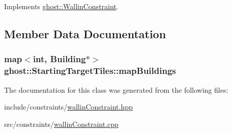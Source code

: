 Implements \hyperlink{classghost_1_1WallinConstraint_aef93d84e063f20ffeb3ff584fe6fabad}{ghost\-::\-Wallin\-Constraint}.



\subsection{Member Data Documentation}
\hypertarget{classghost_1_1StartingTargetTiles_a08e51275da85bfaa8a108976cbd133e2}{
\subsubsection[{map\-Buildings}]{\setlength{\rightskip}{0pt plus 5cm}map$<$int, {\bf Building}$\ast$$>$ ghost\-::\-Starting\-Target\-Tiles\-::map\-Buildings\hspace{0.3cm}{\ttfamily [private]}}}\label{classghost_1_1StartingTargetTiles_a08e51275da85bfaa8a108976cbd133e2}


The documentation for this class was generated from the following files\-:\begin{DoxyCompactItemize}
\item 
include/constraints/\hyperlink{wallinConstraint_8hpp}{wallin\-Constraint.\-hpp}\item 
src/constraints/\hyperlink{wallinConstraint_8cpp}{wallin\-Constraint.\-cpp}\end{DoxyCompactItemize}
